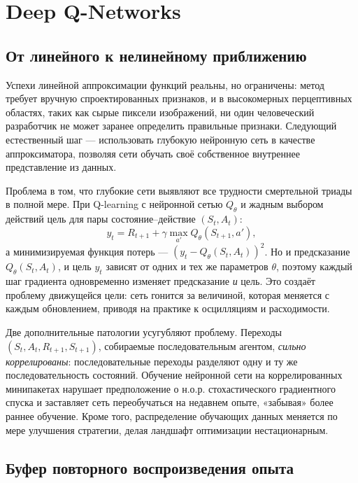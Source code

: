 \section{Deep Q-Networks}
\label{sec:dqn}

\subsection{От линейного к нелинейному приближению}

Успехи линейной аппроксимации функций реальны, но ограничены: метод требует вручную спроектированных признаков, и в высокомерных перцептивных областях, таких как сырые пиксели изображений, ни один человеческий разработчик не может заранее определить правильные признаки.  Следующий естественный шаг --- использовать глубокую нейронную сеть в качестве аппроксиматора, позволяя сети обучать своё собственное внутреннее представление из данных.

Проблема в том, что глубокие сети выявляют все трудности смертельной триады в полной мере.  При Q-learning с нейронной сетью $Q_\theta$ и жадным выбором действий цель для пары состояние--действие $(S_t, A_t)$:
\begin{equation}
\label{eq:naive-deep-q-target}
y_t = R_{t+1} + \gamma \max_{a'} Q_\theta(S_{t+1}, a'),
\end{equation}
а минимизируемая функция потерь --- $(y_t - Q_\theta(S_t, A_t))^2$.  Но и предсказание $Q_\theta(S_t, A_t)$, и цель $y_t$ зависят от одних и тех же параметров $\theta$, поэтому каждый шаг градиента одновременно изменяет предсказание \emph{и} цель.  Это создаёт проблему движущейся цели: сеть гонится за величиной, которая меняется с каждым обновлением, приводя на практике к осцилляциям и расходимости.

Две дополнительные патологии усугубляют проблему.  Переходы $(S_t, A_t, R_{t+1}, S_{t+1})$, собираемые последовательным агентом, \emph{сильно коррелированы}: последовательные переходы разделяют одну и ту же последовательность состояний.  Обучение нейронной сети на коррелированных минипакетах нарушает предположение о н.о.р. стохастического градиентного спуска и заставляет сеть переобучаться на недавнем опыте, «забывая» более раннее обучение.  Кроме того, распределение обучающих данных меняется по мере улучшения стратегии, делая ландшафт оптимизации нестационарным.

\subsection{Буфер повторного воспроизведения опыта}
\label{subsec:experience-replay}

